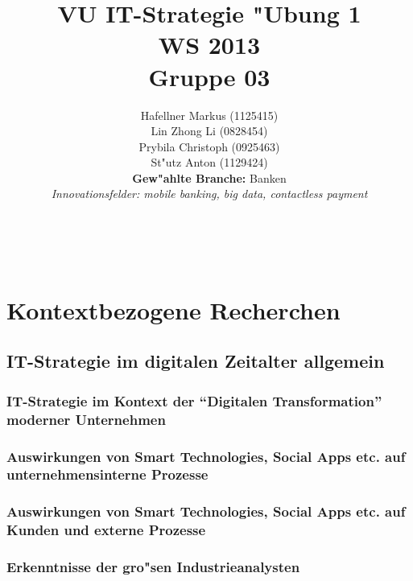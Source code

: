 \documentclass[a4paper, 12pt]{article} %
\title{\textbf{VU IT-Strategie "Ubung 1}\\ %
WS 2013\\\vspace{5pt}
Gruppe 03} %
\author{Hafellner Markus (1125415)\\
 Lin Zhong Li (0828454)\\
 Prybila Christoph (0925463)\\
 St"utz Anton (1129424)\\
 \vspace{10pt}
 \textbf{Gew"ahlte Branche:} Banken
\\{\textit{Innovationsfelder: mobile banking, big data, contactless payment}}} %
\makeatletter
\renewcommand{\maketitle}{ %
\begin{flushright} %
{\LARGE\@title} %

\vspace{50pt} %

{\large\@author} %
\\ \vspace{10pt}\@date %

\vspace{40pt} %
\end{flushright}
}
\makeatother
\begin{document}
\maketitle %

\newpage

\tableofcontents

\newpage


\section{Kontextbezogene Recherchen}
\subsection{IT-Strategie im digitalen Zeitalter allgemein}
\label{subsec:StrategieAllgemein}

\subsubsection{IT-Strategie im Kontext der ``Digitalen Transformation'' moderner Unternehmen}


\subsubsection{Auswirkungen von Smart Technologies, Social Apps etc. auf unternehmensinterne Prozesse}


\subsubsection{Auswirkungen von Smart Technologies, Social Apps etc. auf Kunden und externe Prozesse}


\subsubsection{Erkenntnisse der gro"sen Industrieanalysten}

\end{document}
